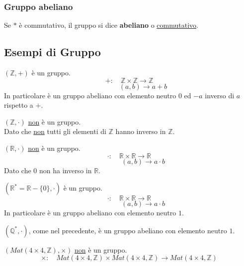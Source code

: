 \documentclass[a4paper,12pt, oneside]{book}
\begin{document}
\subsubsection{Gruppo abeliano}
\begin{definizione}
	Se $*$ è commutativo, il gruppo si dice \textbf{abeliano} o \underline{commutativo}.
\end{definizione}

\begin{shaded}
	\subsection{Esempi di Gruppo}
	\begin{esempio}
		$(\mathbb{Z}, +)$ è un gruppo.\\
		$$+: \quad \mathbb{Z} \times \mathbb{Z} \rightarrow \mathbb{Z}$$
		$$ \qquad \qquad (a,b) \rightarrow a+b$$
		In particolare è un gruppo abeliano con elemento neutro $0$ ed $-a$ inverso di $a$ rispetto a $+$.
	\end{esempio}
	\begin{esempio}
		$(\mathbb{Z}, \cdot)$ \underline{non} è un gruppo.\\
		Dato che \underline{non} tutti gli elementi di $\mathbb{Z}$ hanno inverso in $\mathbb{Z}$.
	\end{esempio}
	\begin{esempio}
		$(\mathbb{R}, \cdot)$ \underline{non} è un gruppo.\\
		$$\cdot: \quad \mathbb{R} \times \mathbb{R} \rightarrow \mathbb{R}$$
		$$ \qquad \qquad (a,b) \rightarrow a\cdot b$$
		Dato che $0$ non ha inverso in $\mathbb{R}$.
	\end{esempio}
	\begin{esempio}
		$(\mathbb{R}^{*} = \mathbb{R}-\{0\}, \cdot)$ è un gruppo.\\
		$$\cdot: \quad \mathbb{R} \times \mathbb{R} \rightarrow \mathbb{R}$$
		$$ \qquad \qquad (a,b) \rightarrow a\cdot b$$
		In particolare è un gruppo abeliano con elemento neutro $1$.
	\end{esempio}
	\begin{esempio}
		$(\mathbb{Q}^{*}, \cdot)$, come nel precedente, è un gruppo abeliano con elemento neutro $1$.
	\end{esempio}
	\begin{esempio}
		$(Mat(4 \times 4, \mathbb{Z}), \times)$ \underline{non} è un gruppo.
		$$\times: \quad Mat(4 \times 4, \mathbb{Z}) \times Mat(4 \times 4, \mathbb{Z}) \rightarrow Mat(4 \times 4, \mathbb{Z})$$

\end{esempio}
\end{shaded}
\end{document}
